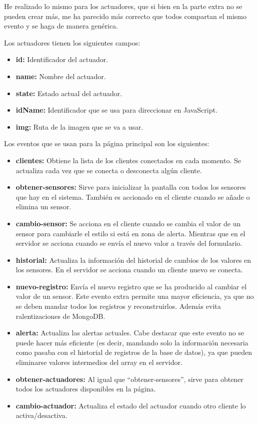 \documentclass{article}
\begin{document}

He realizado lo mismo para los actuadores, que si bien en la parte extra no se pueden crear más, me ha parecido más correcto que todos compartan el mismo evento y se haga de manera genérica.

Los actuadores tienen los siguientes campos:

\begin{itemize}
    \item \textbf{id: }Identificador del actuador.
    \item \textbf{name: }Nombre del actuador.
    \item \textbf{state: }Estado actual del actuador.
    \item \textbf{idName: }Identificador que se usa para direccionar en JavaScript.
    \item \textbf{img: }Ruta de la imagen que se va a usar.
\end{itemize}

Los eventos que se usan para la página principal son los siguientes:

\begin{itemize}
    \item \textbf{clientes: }Obtiene la lista de los clientes conectados en cada momento. Se actualiza cada vez que se conecta o desconecta algún cliente.
    \item \textbf{obtener-sensores: }Sirve para inicializar la pantalla con todos los sensores que hay en el sistema. También es accionado en el cliente cuando se añade o elimina un sensor.
    \item \textbf{cambio-sensor: }Se acciona en el cliente cuando se cambia el valor de un sensor para cambiarle el estilo si está en zona de alerta. Mientras que en el servidor se acciona cuando se envía el nuevo valor a través del formulario.
    \item \textbf{historial: }Actualiza la información del historial de cambios de los valores en los sensores. En el servidor se acciona cuando un cliente nuevo se conecta.
    \item \textbf{nuevo-registro: }Envía el nuevo registro que se ha producido al cambiar el valor de un sensor. Este evento extra permite una mayor eficiencia, ya que no se deben mandar todos los registros y reconstruirlos. Además evita ralentizaciones de MongoDB.
    \item \textbf{alerta: }Actualiza las alertas actuales. Cabe destacar que este evento no se puede hacer más eficiente (es decir, mandando solo la información necesaria como pasaba con el historial de registros de la base de datos), ya que pueden eliminarse valores intermedios del array en el servidor.
    \item \textbf{obtener-actuadores: }Al igual que ``obtener-sensores'', sirve para obtener todos los actuadores disponibles en la página.
    \item \textbf{cambio-actuador: }Actualiza el estado del actuador cuando otro cliente lo activa/desactiva.
\end{itemize}
\end{document}
